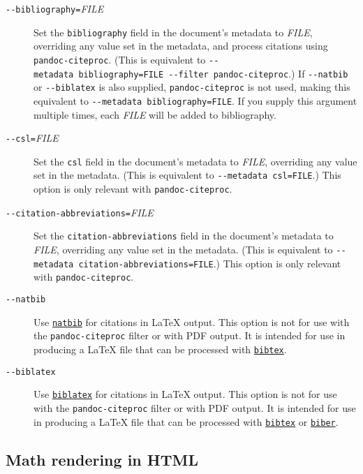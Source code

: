 \documentclass[]{article}
\begin{document}
\begin{description}
\item[\texttt{-\/-bibliography=}\emph{FILE}]
Set the \texttt{bibliography} field in the document's metadata to
\emph{FILE}, overriding any value set in the metadata, and process
citations using \texttt{pandoc-citeproc}. (This is equivalent to
\texttt{-\/-metadata\ bibliography=FILE\ -\/-filter\ pandoc-citeproc}.)
If \texttt{-\/-natbib} or \texttt{-\/-biblatex} is also supplied,
\texttt{pandoc-citeproc} is not used, making this equivalent to
\texttt{-\/-metadata\ bibliography=FILE}. If you supply this argument
multiple times, each \emph{FILE} will be added to bibliography.
\item[\texttt{-\/-csl=}\emph{FILE}]
Set the \texttt{csl} field in the document's metadata to \emph{FILE},
overriding any value set in the metadata. (This is equivalent to
\texttt{-\/-metadata\ csl=FILE}.) This option is only relevant with
\texttt{pandoc-citeproc}.
\item[\texttt{-\/-citation-abbreviations=}\emph{FILE}]
Set the \texttt{citation-abbreviations} field in the document's metadata
to \emph{FILE}, overriding any value set in the metadata. (This is
equivalent to \texttt{-\/-metadata\ citation-abbreviations=FILE}.) This
option is only relevant with \texttt{pandoc-citeproc}.
\item[\texttt{-\/-natbib}]
Use \href{https://ctan.org/pkg/natbib}{\texttt{natbib}} for citations in
LaTeX output. This option is not for use with the
\texttt{pandoc-citeproc} filter or with PDF output. It is intended for
use in producing a LaTeX file that can be processed with
\href{https://ctan.org/pkg/bibtex}{\texttt{bibtex}}.
\item[\texttt{-\/-biblatex}]
Use \href{https://ctan.org/pkg/biblatex}{\texttt{biblatex}} for
citations in LaTeX output. This option is not for use with the
\texttt{pandoc-citeproc} filter or with PDF output. It is intended for
use in producing a LaTeX file that can be processed with
\href{https://ctan.org/pkg/bibtex}{\texttt{bibtex}} or
\href{https://ctan.org/pkg/biber}{\texttt{biber}}.
\end{description}

\subsection{Math rendering in HTML}\label{math-rendering-in-html}
\end{document}
